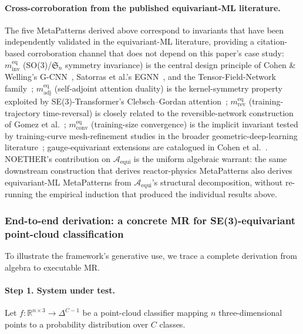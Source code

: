 \documentclass[manuscript]{acmart}
\begin{document}
\paragraph{Cross-corroboration from the published equivariant-ML literature.}
The five MetaPatterns derived above correspond to invariants that have been independently validated in the equivariant-ML literature, providing a citation-based corroboration channel that does not depend on this paper's case study: $m^{\mathrm{eq}}_{\mathrm{inv}}$ (SO(3)/$\mathfrak{S}_n$ symmetry invariance) is the central design principle of Cohen \& Welling's G-CNN~\cite{CohenWelling2016}, Satorras et al.'s EGNN~\cite{Satorras2021EGNN}, and the Tensor-Field-Network family~\cite{ThomasSmidt2018}; $m^{\mathrm{eq}}_{\mathrm{adj}}$ (self-adjoint attention duality) is the kernel-symmetry property exploited by SE(3)-Transformer's Clebsch--Gordan attention~\cite{FuchsTransformer2020}; $m^{\mathrm{eq}}_{\mathrm{rev}}$ (training-trajectory time-reversal) is closely related to the reversible-network construction of Gomez et al.~\cite{Gomez2017Reversible}; $m^{\mathrm{eq}}_{\mathrm{conv}}$ (training-size convergence) is the implicit invariant tested by training-curve mesh-refinement studies in the broader geometric-deep-learning literature~\cite{Bronstein2021GDL}; gauge-equivariant extensions are catalogued in Cohen et al.~\cite{Cohen2019Gauge}. NOETHER's contribution on $\mathcal{A}_{\mathrm{equi}}$ is the uniform algebraic warrant: the same downstream construction that derives reactor-physics MetaPatterns also derives equivariant-ML MetaPatterns from $\mathcal{A}_{\mathrm{equi}}$'s structural decomposition, without re-running the empirical induction that produced the individual results above.

\subsubsection{End-to-end derivation: a concrete MR for SE(3)-equivariant point-cloud classification}
\label{subsec:rho-rot}
\label{subsec:end-to-end}

To illustrate the framework's generative use, we trace a complete derivation from algebra to executable MR.

\paragraph{Step 1. System under test.} Let $f: \mathbb{R}^{n\times 3} \to \Delta^{C-1}$ be a point-cloud classifier mapping $n$ three-dimensional points to a probability distribution over $C$ classes.
\end{document}
